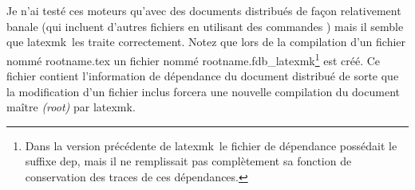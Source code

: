 \documentclass[11pt,french]{article}
\newcommand{\latexmk}{\textsf{latexmk}}
\newcommand{\cmd}[1]{\textsf{#1}}
\begin{document}

Je n'ai testé ces moteurs qu'avec des documents distribués de façon relativement banale (qui incluent d'autres fichiers en utilisant des commandes \verb||) mais il semble que \latexmk\ les traite correctement. Notez que lors de la compilation d'un fichier nommé \cmd{rootname.tex} un fichier nommé \cmd{rootname.fdb\_latexmk}\footnote{Dans la version précédente de \latexmk\ le fichier de dépendance possédait le suffixe \cmd{dep}, mais il ne remplissait pas complètement sa fonction de conservation des traces de ces dépendances.} est créé. Ce fichier contient l'information de dépendance du document distribué de sorte que la modification d'un fichier inclus forcera une nouvelle compilation du document maître \emph{(root)} par \latexmk.


\end{document}
